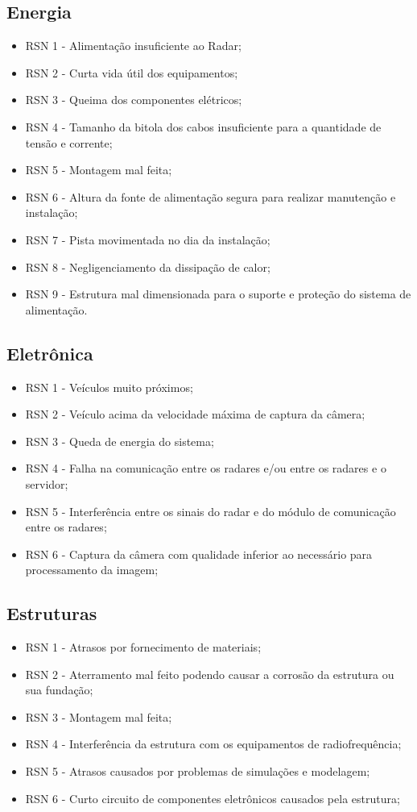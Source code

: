 \subsection{Energia}
\begin{itemize}
   \item RSN 1 - Alimentação insuficiente ao Radar;
   \item RSN 2 - Curta vida útil dos equipamentos; 
   \item RSN 3 - Queima dos componentes elétricos;
   \item RSN 4 - Tamanho da bitola dos cabos insuficiente para a quantidade de tensão e corrente;
   \item RSN 5 - Montagem mal feita;
   \item RSN 6 - Altura da fonte de alimentação segura para realizar manutenção e instalação;
   \item RSN 7 - Pista movimentada no dia da instalação;
   \item RSN 8 - Negligenciamento da dissipação de calor;
   \item RSN 9 - Estrutura mal dimensionada para o suporte e proteção do sistema de alimentação.
\end{itemize}

\subsection{Eletrônica}

\begin{itemize}

	\item RSN 1 - Veículos muito próximos;
	\item RSN 2 - Veículo acima da velocidade máxima de captura da câmera;
	\item RSN 3 - Queda de energia do sistema;
	\item RSN 4 - Falha na comunicação entre os radares e/ou entre os radares e o servidor;
	\item RSN 5 - Interferência entre os sinais do radar e do módulo de comunicação entre os radares;
	\item RSN 6 - Captura da câmera com qualidade inferior ao necessário para processamento da imagem;
	
\end{itemize} 	

\subsection{Estruturas}
\begin{itemize}
	\item RSN 1 - Atrasos por fornecimento de materiais;
	\item RSN 2 - Aterramento mal feito podendo causar a corrosão da estrutura ou sua fundação;
	\item RSN 3 - Montagem mal feita;
	\item RSN 4 - Interferência da estrutura com os equipamentos de radiofrequência;
	\item RSN 5 - Atrasos causados por problemas de simulações e modelagem;
	\item RSN 6 - Curto circuito de componentes eletrônicos causados pela estrutura;
\end{itemize}
